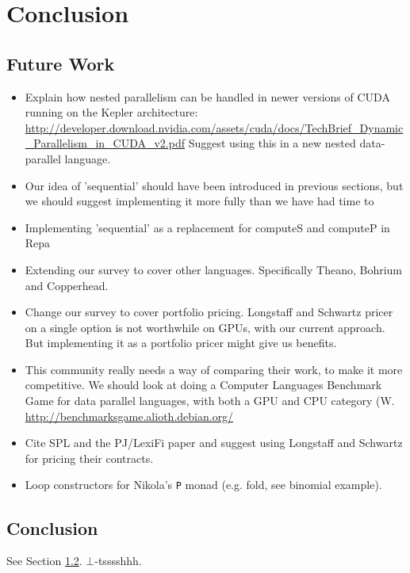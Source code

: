 
\chapter{Conclusion}
\label{chap:Conclusion}
\section{Future Work}

\begin{itemize}
\item Explain how nested parallelism can be handled in newer versions
  of CUDA running on the Kepler architecture:
  \url{http://developer.download.nvidia.com/assets/cuda/docs/TechBrief_Dynamic_Parallelism_in_CUDA_v2.pdf}
  Suggest using this in a new nested data-parallel language.

\item Our idea of 'sequential' should have been introduced in previous
  sections, but we should suggest implementing it more fully than we
  have had time to

\item Implementing 'sequential' as a replacement for computeS and
  computeP in Repa

\item Extending our survey to cover other languages. Specifically
  Theano, Bohrium and Copperhead.

\item Change our survey to cover portfolio pricing. Longstaff and
  Schwartz pricer on a single option is not worthwhile on GPUs, with
  our current approach. But implementing it as a portfolio pricer
  might give us benefits.

\item This community really needs a way of comparing their work, to
  make it more competitive. We should look at doing a Computer
  Languages Benchmark Game for data parallel languages, with both a
  GPU and CPU category (W. \url{http://benchmarksgame.alioth.debian.org/}

\item Cite SPL and the PJ/LexiFi paper and suggest using Longstaff and
  Schwartz for pricing their contracts.
\item Loop constructors for Nikola's \lstinline{P} monad (e.g. fold, see binomial example).
\end{itemize}

\section{Conclusion}
\label{sec:conclusion}

See Section \ref{sec:conclusion}. $\bot$-tsssshhh.


